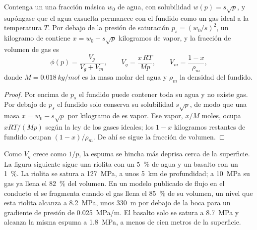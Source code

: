 \begin{proposition}\label{prop:b2:eruptive-styles:gas}
Contenga un  una fracción másica $w_0$ de agua, con solubilidad $w(p) =
s\sqrt p$, y supóngase que el agua exsuelta permanece con el fundido como un gas
ideal a la temperatura $T$. Por debajo de la presión de saturación $p_s = (w_0/s)^2$, un
kilogramo de  contiene $x = w_0 - s\sqrt p$ kilogramos de vapor, y la fracción
de volumen de gas es
\[
\phi(p) = \frac{V_g}{V_g + V_m}, \qquad V_g = \frac{x\,RT}{M p}, \qquad
V_m = \frac{1 - x}{\rho_m},
\]
donde $M = \qty{0.018}{kg/mol}$ es la masa molar del agua y $\rho_m$ la densidad
del fundido.
\end{proposition}

\begin{proof}
Por encima de $p_s$ el fundido puede contener toda su agua y no existe gas. Por debajo de $p_s$ el
fundido solo conserva su solubilidad $s\sqrt p$, de modo que una masa $x = w_0 - s\sqrt p$ por
kilogramo de  es vapor. Ese vapor, $x/M$ moles, ocupa $xRT/(Mp)$ según la
ley de los gases ideales; los $1 - x$ kilogramos restantes de fundido ocupan $(1 - x)/\rho_m$.
De ahí se sigue la fracción de volumen.
\end{proof}

Como $V_g$ crece como $1/p$, la espuma se hincha más deprisa cerca de la superficie. La
figura siguiente sigue una riolita con un \qty{5}{\percent} de agua y un basalto
con un \qty{1}{\percent}. La riolita se satura a \qty{127}{MPa}, a unos
\qty{5}{km} de profundidad; a \qty{10}{MPa} su gas ya llena el \qty{82}{\percent} del
volumen. En un modelo publicado de flujo en el conducto el  se fragmenta cuando el
gas llena el \qty{85}{\percent} de su volumen, un nivel que esta riolita alcanza a
\qty{8.2}{MPa}, unos \qty{330}{m} por debajo de la boca para un gradiente de presión de
\qty{0.025}{MPa/m}. El basalto solo se satura a \qty{8.7}{MPa} y alcanza la
misma espuma a \qty{1.8}{MPa}, a menos de cien metros de la superficie.

